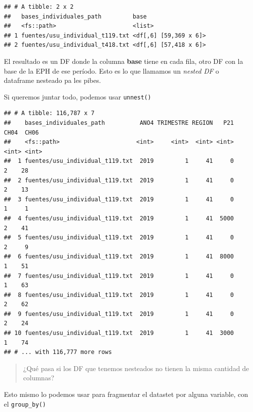 \documentclass[]{book}
\newenvironment{Shaded}{\begin{snugshade}}{\end{snugshade}}
\newcommand{\KeywordTok}[1]{\textcolor[rgb]{0.13,0.29,0.53}{\textbf{#1}}}
\newcommand{\NormalTok}[1]{#1}
\newcommand{\OperatorTok}[1]{\textcolor[rgb]{0.81,0.36,0.00}{\textbf{#1}}}
\newcommand{\StringTok}[1]{\textcolor[rgb]{0.31,0.60,0.02}{#1}}
\begin{document}
\begin{verbatim}
## # A tibble: 2 x 2
##   bases_individuales_path         base                 
##   <fs::path>                      <list>               
## 1 fuentes/usu_individual_t119.txt <df[,6] [59,369 x 6]>
## 2 fuentes/usu_individual_t418.txt <df[,6] [57,418 x 6]>
\end{verbatim}

El resultado es un DF donde la columna \textbf{base} tiene en cada fila, otro DF con la base de la EPH de ese período. Esto es lo que llamamos un \emph{nested DF} o dataframe nesteado pa les pibes.

Si queremos juntar todo, podemos usar \texttt{unnest()}

\begin{Shaded}
\end{Shaded}

\begin{verbatim}
## # A tibble: 116,787 x 7
##    bases_individuales_path          ANO4 TRIMESTRE REGION   P21  CH04  CH06
##    <fs::path>                      <int>     <int>  <int> <int> <int> <int>
##  1 fuentes/usu_individual_t119.txt  2019         1     41     0     2    28
##  2 fuentes/usu_individual_t119.txt  2019         1     41     0     2    13
##  3 fuentes/usu_individual_t119.txt  2019         1     41     0     1     1
##  4 fuentes/usu_individual_t119.txt  2019         1     41  5000     2    41
##  5 fuentes/usu_individual_t119.txt  2019         1     41     0     2     9
##  6 fuentes/usu_individual_t119.txt  2019         1     41  8000     1    51
##  7 fuentes/usu_individual_t119.txt  2019         1     41     0     1    63
##  8 fuentes/usu_individual_t119.txt  2019         1     41     0     2    62
##  9 fuentes/usu_individual_t119.txt  2019         1     41     0     2    24
## 10 fuentes/usu_individual_t119.txt  2019         1     41  3000     1    74
## # ... with 116,777 more rows
\end{verbatim}

\begin{quote}
¿Qué pasa si los DF que tenemos nesteados no tienen la misma cantidad de columnas?
\end{quote}

Esto mismo lo podemos usar para fragmentar el datastet por alguna variable, con el \texttt{group\_by()}
\end{document}
